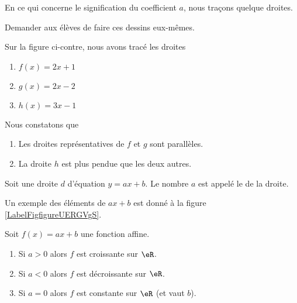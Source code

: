 En ce qui concerne le signification du coefficient \( a\), nous traçons quelque droites.


\begin{remark}
    Demander aux élèves de faire ces dessins eux-mêmes.
\end{remark}

\newpage

\begin{multicols}{2}
    Sur la figure ci-contre, nous avons tracé les droites
    \begin{enumerate}
        \item
            \( f(x)=2x+1\)
        \item
            \( g(x)=2x-2\)
        \item
            \( h(x)=3x-1\)
    \end{enumerate}

    \columnbreak

    \begin{center}

    \end{center}

\end{multicols}

Nous constatons que
\begin{enumerate}
    \item
        Les droites représentatives de \( f\) et \( g\) sont parallèles.
    \item
        La droite \( h\) est plus pendue que les deux autres.
\end{enumerate}

\begin{definition}
    Soit une droite \( d\) d'équation \( y=ax+b\). Le nombre \( a\) est appelé le  de la droite.
\end{definition}



Un exemple des éléments de \( ax+b\) est donné à la figure \ref{LabelFigfigureUERGVgS}. %
\newcommand{\CaptionFigfigureUERGVgS}{Une droite et quelque éléments de son équation.}


\begin{propriete}
    Soit \( f(x)=ax+b\) une fonction affine.
    \begin{enumerate}
        \item
            Si \( a>0\) alors \( f\) est croissante sur \( \eR\).
        \item
            Si \( a<0\) alors \( f\) est décroissante sur \( \eR\).
        \item
            Si \( a=0\) alors \( f\) est constante sur \( \eR\) (et vaut \( b\)).
    \end{enumerate}
\end{propriete}


